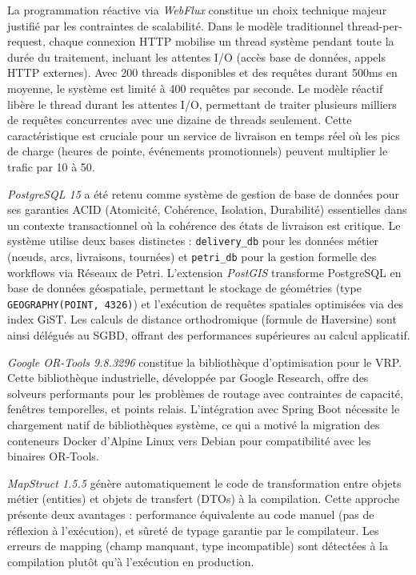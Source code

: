 La programmation réactive via \textit{WebFlux} constitue un choix technique majeur justifié par les contraintes de scalabilité. Dans le modèle traditionnel thread-per-request, chaque connexion HTTP mobilise un thread système pendant toute la durée du traitement, incluant les attentes I/O (accès base de données, appels HTTP externes). Avec 200 threads disponibles et des requêtes durant 500ms en moyenne, le système est limité à 400 requêtes par seconde. Le modèle réactif libère le thread durant les attentes I/O, permettant de traiter plusieurs milliers de requêtes concurrentes avec une dizaine de threads seulement. Cette caractéristique est cruciale pour un service de livraison en temps réel où les pics de charge (heures de pointe, événements promotionnels) peuvent multiplier le trafic par 10 à 50.

\textit{PostgreSQL 15} a été retenu comme système de gestion de base de données pour ses garanties ACID (Atomicité, Cohérence, Isolation, Durabilité) essentielles dans un contexte transactionnel où la cohérence des états de livraison est critique. Le système utilise deux bases distinctes : \texttt{delivery\_db} pour les données métier (nœuds, arcs, livraisons, tournées) et \texttt{petri\_db} pour la gestion formelle des workflows via Réseaux de Petri. L'extension \textit{PostGIS} transforme PostgreSQL en base de données géospatiale, permettant le stockage de géométries (type \texttt{GEOGRAPHY(POINT, 4326)}) et l'exécution de requêtes spatiales optimisées via des index GiST. Les calculs de distance orthodromique (formule de Haversine) sont ainsi délégués au SGBD, offrant des performances supérieures au calcul applicatif.

\textit{Google OR-Tools 9.8.3296} constitue la bibliothèque d'optimisation pour le VRP. Cette bibliothèque industrielle, développée par Google Research, offre des solveurs performants pour les problèmes de routage avec contraintes de capacité, fenêtres temporelles, et points relais. L'intégration avec Spring Boot nécessite le chargement natif de bibliothèques système, ce qui a motivé la migration des conteneurs Docker d'Alpine Linux vers Debian pour compatibilité avec les binaires OR-Tools.

\textit{MapStruct 1.5.5} génère automatiquement le code de transformation entre objets métier (entities) et objets de transfert (DTOs) à la compilation. Cette approche présente deux avantages : performance équivalente au code manuel (pas de réflexion à l'exécution), et sûreté de typage garantie par le compilateur. Les erreurs de mapping (champ manquant, type incompatible) sont détectées à la compilation plutôt qu'à l'exécution en production.

